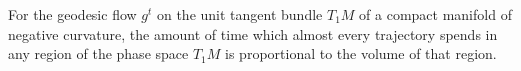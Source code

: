 For the geodesic flow $g^t$ on the unit tangent bundle $T_1M$ of a compact manifold of negative curvature, the amount of time which almost every trajectory spends in any region of the phase space $T_1M$ is proportional to the volume of that region.
